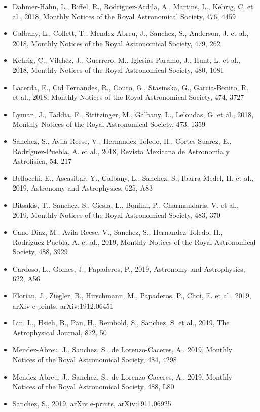 \documentclass{letter}
\begin{document}
\begin{enumerate}
\begin{itemize}
\item Dahmer-Hahn, L., Riffel, R., Rodriguez-Ardila, A., Martins, L., Kehrig, C. et al., 2018, Monthly Notices of the Royal Astronomical Society, 476, 4459
\item Galbany, L., Collett, T., Mendez-Abreu, J., Sanchez, S., Anderson, J. et al., 2018, Monthly Notices of the Royal Astronomical Society, 479, 262
\item Kehrig, C., Vilchez, J., Guerrero, M., Iglesias-Paramo, J., Hunt, L. et al., 2018, Monthly Notices of the Royal Astronomical Society, 480, 1081
\item Lacerda, E., Cid Fernandes, R., Couto, G., Stasinska, G., Garcia-Benito, R. et al., 2018, Monthly Notices of the Royal Astronomical Society, 474, 3727
\item Lyman, J., Taddia, F., Stritzinger, M., Galbany, L., Leloudas, G. et al., 2018, Monthly Notices of the Royal Astronomical Society, 473, 1359
\item Sanchez, S., Avila-Reese, V., Hernandez-Toledo, H., Cortes-Suarez, E., Rodriguez-Puebla, A. et al., 2018, Revista Mexicana de Astronomia y Astrofisica, 54, 217
\item Bellocchi, E., Ascasibar, Y., Galbany, L., Sanchez, S., Ibarra-Medel, H. et al., 2019, Astronomy and Astrophysics, 625, A83
\item Bitsakis, T., Sanchez, S., Ciesla, L., Bonfini, P., Charmandaris, V. et al., 2019, Monthly Notices of the Royal Astronomical Society, 483, 370
\item Cano-Diaz, M., Avila-Reese, V., Sanchez, S., Hernandez-Toledo, H., Rodriguez-Puebla, A. et al., 2019, Monthly Notices of the Royal Astronomical Society, 488, 3929
\item Cardoso, L., Gomes, J., Papaderos, P., 2019, Astronomy and Astrophysics, 622, A56
\item Florian, J., Ziegler, B., Hirschmann, M., Papaderos, P., Choi, E. et al., 2019, arXiv e-prints, arXiv:1912.06451
\item Lin, L., Hsieh, B., Pan, H., Rembold, S., Sanchez, S. et al., 2019, The Astrophysical Journal, 872, 50
\item Mendez-Abreu, J., Sanchez, S., de Lorenzo-Caceres, A., 2019, Monthly Notices of the Royal Astronomical Society, 484, 4298
\item Mendez-Abreu, J., Sanchez, S., de Lorenzo-Caceres, A., 2019, Monthly Notices of the Royal Astronomical Society, 488, L80
\item Sanchez, S., 2019, arXiv e-prints, arXiv:1911.06925

\end{itemize}
\end{enumerate}
\end{document}
